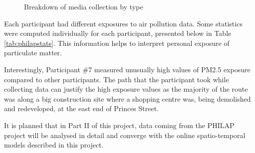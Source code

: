 \begin{figure}[H]
    \centering
    \caption{Breakdown of media collection by type}
    \label{fig:mediacollected}
\end{figure}

Each participant had different exposures to air pollution data. Some statistics were computed individually for each participant, presented below in Table \ref{tab:philapstats}. This information helps to interpret personal exposure of particulate matter. 

\begin{table}[H]
\centering
{}
\caption{Participants' statistics}
\label{tab:philapstats}
\end{table}

Interestingly, Participant \#7 measured unusually high values of PM2.5 exposure compared to other participants. The path that the participant took while collecting data can justify the high exposure values as the majority of the route was along a big construction site where a shopping centre was, being demolished and redeveloped, at the east end of Princes Street.

It is planned that in Part II of this project, data coming from the PHILAP project will be analysed in detail and converge with the online spatio-temporal models described in this project.
